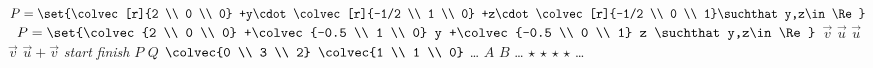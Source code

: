 \documentclass{book}
\begin{document}
\stopmpxshipout
\mpxshipout%
{\hspace*{0.05in} \small 
          $P=\set{\colvec[r]{2 \\ 0 \\ 0}
         +y\cdot\colvec[r]{-1/2 \\ 1 \\ 0}
         +z\cdot\colvec[r]{-1/2 \\ 0 \\ 1}\suchthat y,z\in\Re}$}%
\stopmpxshipout
\mpxshipout%
\hbox{\hspace*{0.05in} \small 
                       $P=\set{\colvec{2 \\ 0 \\ 0}
		               +\colvec{-0.5 \\ 1 \\ 0} y
		               +\colvec{-0.5 \\ 0 \\ 1} z
		               \suchthat y,z\in\Re}$}%
\stopmpxshipout
\mpxshipout%
{\small $\vec{v}$}%
\stopmpxshipout
\mpxshipout%
{\small $\vec{u}$}%
\stopmpxshipout
\mpxshipout%
{\small $\vec{u}$}%
\stopmpxshipout
\mpxshipout%
{\small $\vec{v}$}%
\stopmpxshipout
\mpxshipout%
{\small $\vec{u}+\vec{v}$}%
\stopmpxshipout
\mpxshipout%
{\small\textit{start}}%
\stopmpxshipout
\mpxshipout%
{\small\textit{finish}}%
\stopmpxshipout
\mpxshipout%
{\small $P$}%
\stopmpxshipout
\mpxshipout%
{\small $Q$}%
\stopmpxshipout
\mpxshipout%
{\small
                          $\colvec{0 \\ 3 \\ 2}$}%
\stopmpxshipout
\mpxshipout%
{\small
                         $\colvec{1 \\ 1 \\ 0}$}%
\stopmpxshipout
\mpxshipout%
{\small \ldots}%
\stopmpxshipout
\mpxshipout%
{\small $A$}%
\stopmpxshipout
\mpxshipout%
{\small $B$}%
\stopmpxshipout
\mpxshipout%
{\small \ldots}%
\stopmpxshipout
\mpxshipout%
{\small $\star$}%
\stopmpxshipout
\mpxshipout%
{\small $\star$}%
\stopmpxshipout
\mpxshipout%
{\small $\star$}%
\stopmpxshipout
\mpxshipout%
{\small $\star$}%
\stopmpxshipout
\mpxshipout%
{\small \ldots}%
\end{document}
